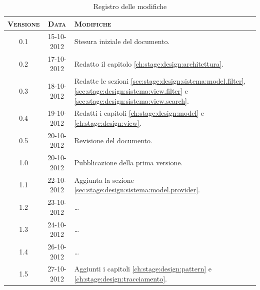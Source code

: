\documentclass[10pt,a4paper,headinclude,footinclude,hidelinks]{scrreprt} %
\begin{document}
    \title{\rmfamily\normalfont{}}
    \author{}
    \date{\today}
    
    \maketitle
    
    \begin{abstract}
        \noindent Il documento riporta le informazioni di progettazione riguardanti l'interfaccia grafica per la visualizzazione e la navigazione dei contenuti.
    \end{abstract}
    
	\begin{table}[ht]
	\centering
	\begin{tabular}{|c|c|l|}
	\hline
	\textsc{Versione} & \textsc{Data} & \textsc{Modifiche} \\ \hline
	0.1 & 15-10-2012 & Stesura iniziale del documento. \\ \hline
	0.2 & 17-10-2012 & Redatto il capitolo \ref{ch:stage:design:architettura}. \\ \hline
	0.3 & 18-10-2012 & Redatte le sezioni \ref{sec:stage:design:sistema:model.filter}, \ref{sec:stage:design:sistema:view.filter} e \ref{sec:stage:design:sistema:view.search}. \\ \hline
	0.4 & 19-10-2012 & Redatti i capitoli \ref{ch:stage:design:model} e \ref{ch:stage:design:view}. \\ \hline
	0.5 & 20-10-2012 & Revisione del documento. \\ \hline
	1.0 & 20-10-2012 & Pubblicazione della prima versione. \\ \hline
	1.1 & 22-10-2012 & Aggiunta la sezione \ref{sec:stage:design:sistema:model.provider}. \\ \hline
	1.2 & 23-10-2012 & \ldots \\ \hline
	1.3 & 24-10-2012 & \ldots \\ \hline
	1.4 & 26-10-2012 & \ldots \\ \hline
	1.5 & 27-10-2012 & Aggiunti i capitoli \ref{ch:stage:design:pattern} e \ref{ch:stage:design:tracciamento}. \\ \hline
	\end{tabular}
	\caption{Registro delle modifiche}
	\label{tab:stage:wp:workload}
	\end{table}

	\tableofcontents

\end{document}
